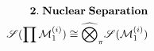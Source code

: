 \documentclass[preview]{standalone}
\begin{document}
\begin{align*}
\special{dvisvgm:raw <g id='unique000'>}\mathbf{2.\;Nuclear\;Separation}\\\mathscr{S}(\prod\mathcal{M}_1^{(i)})\cong\widehat{\bigotimes}_\pi\mathscr{S}(\mathcal{M}_1^{(i)})\special{dvisvgm:raw </g>}
\end{align*}
\end{document}
